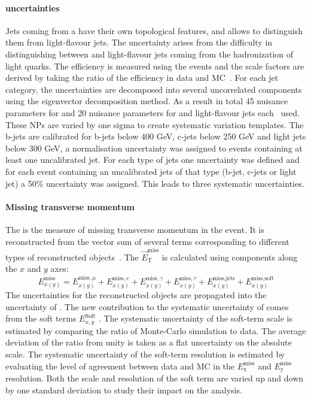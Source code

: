 \paragraph{\btag uncertainties}
Jets coming from a \bquarks have their own topological features, and \btag allows to distinguish them from light-flavour jets.  The uncertainty arises from the difficulty in distinguishing between \bquarks and light-flavour jets coming from the hadronization of light quarks.  The \btag efficiency is measured using the \ttbar events and the scale factors are derived by taking the ratio of the efficiency in data and MC~\cite{ATLAS:2019bwq}. For each jet category, the uncertainties are decomposed into several uncorrelated components using the eigenvector decomposition method. As a result in total 45 nuisance parameters for \bjets and 20 nuisance parameters for \cjets and light-flavour jets each~\cite{ATLAS:2017bcq} used. These NPs are varied by one sigma to create systematic variation templates.
The b-jets are calibrated for b-jets below 400 GeV, c-jets below 250 GeV and light jets below 300 GeV, a normalisation uncertainty was assigned to events containing at least one uncalibrated jet. For each type of jets one uncertainty was defined and for each event containing an uncalibrated jets of that type (b-jet, c-jets or light jet) a 50\% uncertainty was assigned. This leads to three systematic uncertainties.

\paragraph*{Missing transverse momentum}
The \met is the measure of missing transverse momentum in the event. It is reconstructed from the vector sum of several terms corresponding to different types of reconstructed objects~\cite{ATLAS:2018ghb}. The $\vec{E}_{\text{T}}^{\text{miss}}$ is calculated using components along the $x$ and $y$ axes: $$E_{x(y)}^{\text{miss}} = E_{x(y)}^{\text{miss},\mu} + E_{x(y)}^{\text{miss},e}  + E_{x(y)}^{\text{miss},\gamma} + E_{x(y)}^{\text{miss},\tau}  + E_{x(y)}^{\text{miss,jets}} + E_{x(y)}^{\text{miss,soft}} $$ The uncertainties for the reconstructed objects are propagated into the uncertainty of \met. The new contribution to the systematic uncertainty of \met comes from the soft terms $E_{x,y}^{\text{Soft}}$ . The systematic uncertainty of the soft-term scale is estimated by comparing the ratio of Monte-Carlo simulation to data. The average deviation of the ratio from unity is taken as a flat uncertainty on the absolute scale. The systematic uncertainty of the soft-term resolution is estimated by evaluating the level of agreement between data and MC in the $E^{\text{miss}}_{\text{x}}$ and $E^{\text{miss}}_{\text{y}}$ resolution. Both the scale and resolution of the soft term are varied up and down by one standard deviation to study their impact on the analysis. 

